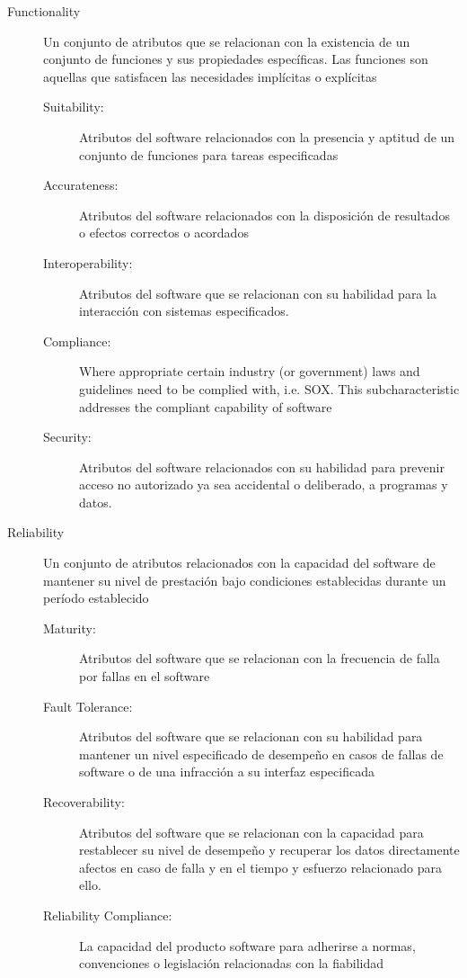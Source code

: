 
\begin{comment}
La entrada de wikipedia es una traducción literal del estándar 9126, ojalá
no se entienda como plagio. No sé si dejar los 
\end{comment}

\begin{description}

  \item[Functionality] Un conjunto de atributos que se relacionan con la 
existencia de un conjunto de funciones y sus propiedades específicas. 
Las funciones son aquellas que satisfacen las necesidades 
implícitas o explícitas

\SpecialItem
	\begin{description}
  		\item	 [Suitability:]  Atributos del software relacionados con la 
presencia y aptitud de un conjunto de funciones para tareas especificadas
  		\item[Accurateness:] Atributos del software relacionados con 
la disposición de resultados o efectos correctos o acordados
  		\item[Interoperability:] Atributos del software que se relacionan 
con su habilidad para la interacción con sistemas especificados.
  		\item[Compliance:]  Where appropriate certain industry (or government) 
laws and guidelines need to be complied with, i.e. SOX. This subcharacteristic 
addresses the compliant capability of software
  		\item[Security:] Atributos del software relacionados con su 
habilidad para prevenir acceso no autorizado ya sea accidental o 
deliberado, a programas y datos.
	\end{description}
	
  \item[Reliability] Un conjunto de atributos relacionados con la capacidad 
del software de mantener su nivel de prestación bajo condiciones
 establecidas durante un período establecido
	\SpecialItem
	\begin{description}
  		\item[Maturity:]  Atributos del software que se relacionan 
con la frecuencia de falla por fallas en el software
  		\item[Fault Tolerance:] Atributos del software que se relacionan 
con su habilidad para mantener un nivel especificado de desempeño en 
casos de fallas de software o de una infracción a su interfaz especificada
  		\item[Recoverability:] Atributos del software que se relacionan 
con la capacidad para restablecer su nivel de desempeño y recuperar 
los datos directamente afectos en caso de falla y en el tiempo y 
esfuerzo relacionado para ello.
  		\item[Reliability Compliance:]  La capacidad del producto 
software para adherirse a normas, convenciones o legislación 
relacionadas con la fiabilidad	
	\end{description}


\end{description}
